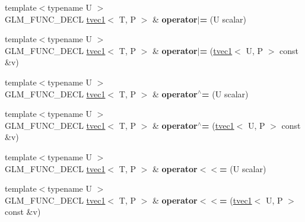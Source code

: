 \begin{DoxyCompactItemize}
\item 
\mbox{\label{structglm_1_1tvec1_aced10faa0a595046810e9560fe225dcb}} 
{\footnotesize template$<$typename U $>$ }\\G\+L\+M\+\_\+\+F\+U\+N\+C\+\_\+\+D\+E\+CL \hyperlink{structglm_1_1tvec1}{tvec1}$<$ T, P $>$ \& {\bfseries operator$\vert$=} (U scalar)
\item 
\mbox{\label{structglm_1_1tvec1_a6c8723729c52dbf1511bb50723f686c0}} 
{\footnotesize template$<$typename U $>$ }\\G\+L\+M\+\_\+\+F\+U\+N\+C\+\_\+\+D\+E\+CL \hyperlink{structglm_1_1tvec1}{tvec1}$<$ T, P $>$ \& {\bfseries operator$\vert$=} (\hyperlink{structglm_1_1tvec1}{tvec1}$<$ U, P $>$ const \&v)
\item 
\mbox{\label{structglm_1_1tvec1_a04b2e23d74453c11bbab313f4b7cdd71}} 
{\footnotesize template$<$typename U $>$ }\\G\+L\+M\+\_\+\+F\+U\+N\+C\+\_\+\+D\+E\+CL \hyperlink{structglm_1_1tvec1}{tvec1}$<$ T, P $>$ \& {\bfseries operator$^\wedge$=} (U scalar)
\item 
\mbox{\label{structglm_1_1tvec1_abc6f6df2f1164cb293976e0418e44690}} 
{\footnotesize template$<$typename U $>$ }\\G\+L\+M\+\_\+\+F\+U\+N\+C\+\_\+\+D\+E\+CL \hyperlink{structglm_1_1tvec1}{tvec1}$<$ T, P $>$ \& {\bfseries operator$^\wedge$=} (\hyperlink{structglm_1_1tvec1}{tvec1}$<$ U, P $>$ const \&v)
\item 
\mbox{\label{structglm_1_1tvec1_a1fb987744e67cc6944d621a1a658eb20}} 
{\footnotesize template$<$typename U $>$ }\\G\+L\+M\+\_\+\+F\+U\+N\+C\+\_\+\+D\+E\+CL \hyperlink{structglm_1_1tvec1}{tvec1}$<$ T, P $>$ \& {\bfseries operator$<$$<$=} (U scalar)
\item 
\mbox{\label{structglm_1_1tvec1_a2ed7c375c837621c846ee0b31104e34a}} 
{\footnotesize template$<$typename U $>$ }\\G\+L\+M\+\_\+\+F\+U\+N\+C\+\_\+\+D\+E\+CL \hyperlink{structglm_1_1tvec1}{tvec1}$<$ T, P $>$ \& {\bfseries operator$<$$<$=} (\hyperlink{structglm_1_1tvec1}{tvec1}$<$ U, P $>$ const \&v)
\item 

\end{DoxyCompactItemize}
